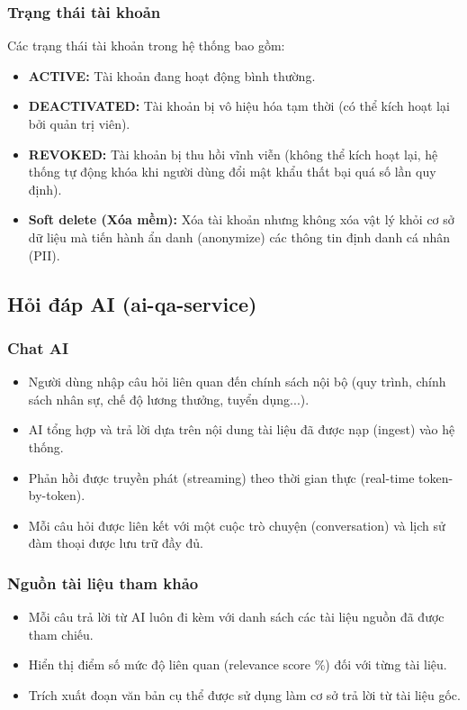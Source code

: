 \documentclass[12pt,a4paper]{report}
\begin{document}
\subsubsection{Trạng thái tài khoản}
Các trạng thái tài khoản trong hệ thống bao gồm:
\begin{itemize}
    \item \textbf{ACTIVE:} Tài khoản đang hoạt động bình thường.
    \item \textbf{DEACTIVATED:} Tài khoản bị vô hiệu hóa tạm thời (có thể kích hoạt lại bởi quản trị viên).
    \item \textbf{REVOKED:} Tài khoản bị thu hồi vĩnh viễn (không thể kích hoạt lại, hệ thống tự động khóa khi người dùng đổi mật khẩu thất bại quá số lần quy định).
    \item \textbf{Soft delete (Xóa mềm):} Xóa tài khoản nhưng không xóa vật lý khỏi cơ sở dữ liệu mà tiến hành ẩn danh (anonymize) các thông tin định danh cá nhân (PII).
\end{itemize}

\subsection{Hỏi đáp AI (ai-qa-service)}

\subsubsection{Chat AI}
\begin{itemize}
    \item Người dùng nhập câu hỏi liên quan đến chính sách nội bộ (quy trình, chính sách nhân sự, chế độ lương thưởng, tuyển dụng...).
    \item AI tổng hợp và trả lời dựa trên nội dung tài liệu đã được nạp (ingest) vào hệ thống.
    \item Phản hồi được truyền phát (streaming) theo thời gian thực (real-time token-by-token).
    \item Mỗi câu hỏi được liên kết với một cuộc trò chuyện (conversation) và lịch sử đàm thoại được lưu trữ đầy đủ.
\end{itemize}

\subsubsection{Nguồn tài liệu tham khảo}
\begin{itemize}
    \item Mỗi câu trả lời từ AI luôn đi kèm với danh sách các tài liệu nguồn đã được tham chiếu.
    \item Hiển thị điểm số mức độ liên quan (relevance score \%) đối với từng tài liệu.
    \item Trích xuất đoạn văn bản cụ thể được sử dụng làm cơ sở trả lời từ tài liệu gốc.
\end{itemize}
\end{document}

